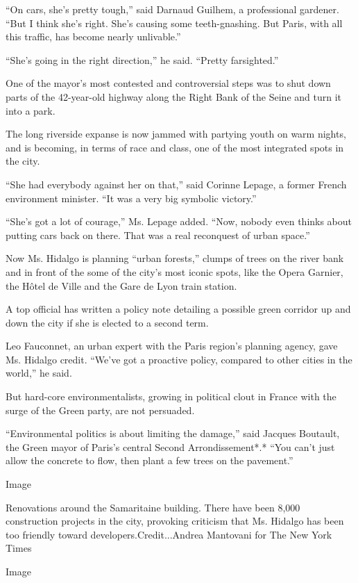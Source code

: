 ``On cars, she's pretty tough,'' said Darnaud Guilhem, a professional
gardener. ``But I think she's right. She's causing some teeth-gnashing.
But Paris, with all this traffic, has become nearly unlivable.''

``She's going in the right direction,'' he said. ``Pretty farsighted.''

One of the mayor's most contested and controversial steps was to shut
down parts of the 42-year-old highway along the Right Bank of the Seine
and turn it into a park.

The long riverside expanse is now jammed with partying youth on warm
nights, and is becoming, in terms of race and class, one of the most
integrated spots in the city.

``She had everybody against her on that,'' said Corinne Lepage, a former
French environment minister. ``It was a very big symbolic victory.''

``She's got a lot of courage,'' Ms. Lepage added. ``Now, nobody even
thinks about putting cars back on there. That was a real reconquest of
urban space.''

Now Ms. Hidalgo is planning ``urban forests,'' clumps of trees on the
river bank and in front of the some of the city's most iconic spots,
like the Opera Garnier, the Hôtel de Ville and the Gare de Lyon train
station.

A top official has written a policy note detailing a possible green
corridor up and down the city if she is elected to a second term.

Leo Fauconnet, an urban expert with the Paris region's planning agency,
gave Ms. Hidalgo credit. ``We've got a proactive policy, compared to
other cities in the world,'' he said.

But hard-core environmentalists, growing in political clout in France
with the surge of the Green party, are not persuaded.

``Environmental politics is about limiting the damage,'' said Jacques
Boutault, the Green mayor of Paris's central Second Arrondissement*.*
``You can't just allow the concrete to flow, then plant a few trees on
the pavement.''

Image

Renovations around the Samaritaine building. There have been 8,000
construction projects in the city, provoking criticism that Ms. Hidalgo
has been too friendly toward developers.Credit...Andrea Mantovani for
The New York Times

Image

